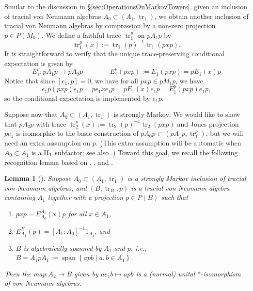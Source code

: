 \documentclass[11pt]{article}
\theoremstyle{plain}
\newtheorem{lem}[thm]{Lemma}
\theoremstyle{definition}
\DeclareMathOperator{\spann}{span}
\DeclareMathOperator{\tr}{tr}
\newcommand{\set}[2]{\left\{#1 \middle| #2\right\}}
\begin{document}
Similar to the discussion in \S\ref{sec:OperationsOnMarkovTowers}, 
given an inclusion of tracial von Neumann algebras $A_0\subset (A_1, \tr_1)$, we obtain another inclusion of tracial von Neumann algebras by compression by a non-zero projection $p\in P(M_0)$.
We define a faithful trace $\tr_1^p$ on $pA_1 p$ by
\begin{equation}
\label{eq:CompressedTrace1}
\tr^p_1(x) := \tr_1(p)^{-1}\tr_1(pxp).
\end{equation}
It is straightforward to verify that the unique trace-preserving conditional expectation is given by 
\begin{equation}
\label{eq:CompressedConditionalExpectation1}
E^p_1 : pA_1p \to pA_{0}p
\qquad
\qquad
E^p_1(pxp) := E_1(pxp) = pE_1(x)p
\end{equation}
Notice that since $[e_1,p] = 0$, we have for all $pxp \in pM_1 p$, we have 
\begin{equation}
\label{eq:CompressionImplementsConditionalExpectation1}
e_1p (pxp) e_1p = p e_1xe_1p = pE_1(x)e_1p = E_1^p(pxp)e_1p,
\end{equation}
so the conditional expectation is implemented by $e_1p$.

Suppose now that $A_0 \subset (A_1, \tr_1)$ is strongly Markov.
We would like to show that $pA_2p$ with trace $\tr^p_2(x):=\tr_2(p)^{-1}\tr_2(pxp)$ and Jones projection $pe_1$
is isomorphic to the basic construction of $pA_0p \subset (pA_1p, \tr_1^p)$, but we will need an extra assumption on $p$.
(This extra assumption will be automatic when $A_0 \subset A_1$ is a ${\rm II}_1$ subfactor; see also \cite[Lem.~2.4]{MR1262294}.)
Toward this goal, we recall the following recognition lemma based on \cite[Prop.~1.2]{MR965748}, \cite[Lem.~5.8]{MR1073519}, and \cite[Lem.~5.3.1]{MR1473221}.

\begin{lem}[{\cite[Lem.~2.15]{MR2812459}}]
\label{lem:BasicConstructionRecognition}
Suppose $A_0 \subset (A_1, \tr_1)$ is a strongly Markov inclusion of tracial von Neumann algebras, and $(B, \tr_B, p)$ is a tracial von Neumann algebra containing $A_1$ together with a projection $p\in P(B)$ such that
\begin{enumerate}[label={\rm(R\arabic*)}]
\item
\label{eq:RecognitionImplement}
$pxp = E_{A_0}^{A_1}(x)p$ for all $x\in A_1$,
\item
\label{eq:RecognitionMarkov}
$E^{B}_{A_1}(p) = [A_1:A_0]^{-1} 1_{A_1}$, and
\item
\label{eq:RecognitionSpan}
$B$ is algebraically spanned by $A_1$ and $p$, i.e., $B = A_1pA_1 := \spann\set{apb}{a,b\in A_1}$.
\end{enumerate}
Then the map $A_2\to B$ given by $ae_1b \mapsto apb$ is a (normal) unital $*$-isomorphism of von Neumann algebras.
\end{lem}
\end{document}
